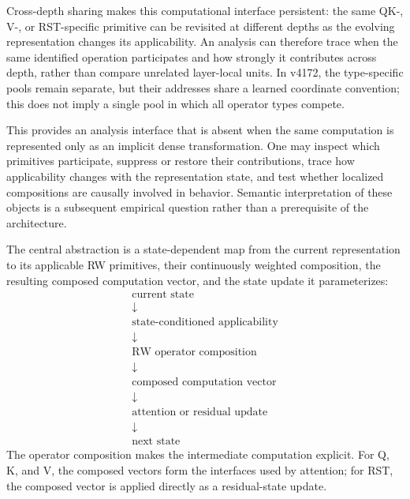 \documentclass{article}
\begin{document}
Cross-depth sharing makes this computational interface persistent: the same
QK-, V-, or RST-specific primitive can be revisited at different depths as the
evolving representation changes its applicability. An analysis can therefore
trace when the same identified operation participates and how strongly it
contributes across depth, rather than compare unrelated layer-local units. In
v4172, the type-specific pools remain separate, but their addresses share a
learned coordinate convention; this does not imply a single pool in which all
operator types compete.

This provides an analysis interface that is absent when the same computation is
represented only as an implicit dense transformation. One may inspect which
primitives participate, suppress or restore their contributions, trace how
applicability changes with the representation state, and test whether localized
compositions are causally involved in behavior. Semantic interpretation of
these objects is a subsequent empirical question rather than a prerequisite of
the architecture.

The central abstraction is a state-dependent map from the current
representation to its applicable RW primitives, their continuously weighted
composition, the resulting composed computation vector, and the state update it
parameterizes:
\[
\begin{array}{c}
\text{current state}\\[-0.15em]
\downarrow\\[-0.15em]
\text{state-conditioned applicability}\\[-0.15em]
\downarrow\\[-0.15em]
\text{RW operator composition}\\[-0.15em]
\downarrow\\[-0.15em]
\text{composed computation vector}\\[-0.15em]
\downarrow\\[-0.15em]
\text{attention or residual update}\\[-0.15em]
\downarrow\\[-0.15em]
\text{next state}
\end{array}
\]
The operator composition makes the intermediate computation explicit. For Q,
K, and V, the composed vectors form the interfaces used by attention; for RST,
the composed vector is applied directly as a residual-state update.
\end{document}
